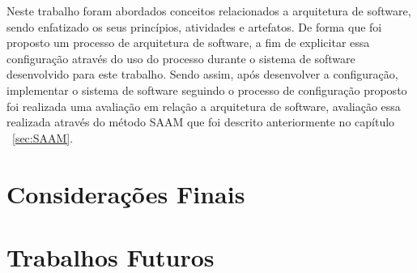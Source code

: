 Neste trabalho foram abordados conceitos relacionados a arquitetura de software, sendo enfatizado os seus princípios, atividades e artefatos. De forma que foi proposto um processo de arquitetura de software, a fim de explicitar essa configuração através do uso do processo durante o sistema de software desenvolvido para este trabalho. Sendo assim, após desenvolver a configuração, implementar o sistema de software seguindo o processo de configuração proposto foi realizada uma avaliação em relação a arquitetura de software, avaliação essa realizada através do método \acrfull{SAAM} que foi descrito anteriormente no capítulo ~\ref{sec:SAAM}. 

\section{Considerações Finais}

\section{Trabalhos Futuros}
